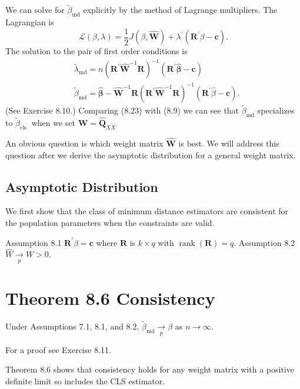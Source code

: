 \documentclass[10pt]{article}
\begin{document}
We can solve for $\widetilde{\beta}_{\mathrm{md}}$ explicitly by the method of Lagrange multipliers. The Lagrangian is
$$
\mathscr{L}(\beta, \lambda)=\frac{1}{2} J(\beta, \widehat{\boldsymbol{W}})+\lambda^{\prime}\left(\boldsymbol{R}^{\prime} \beta-\boldsymbol{c}\right) .
$$
The solution to the pair of first order conditions is
$$
\begin{aligned}
&\widetilde{\lambda}_{\mathrm{md}}=n\left(\boldsymbol{R}^{\prime} \widehat{\boldsymbol{W}}^{-1} \boldsymbol{R}\right)^{-1}\left(\boldsymbol{R}^{\prime} \widehat{\boldsymbol{\beta}}-\boldsymbol{c}\right) \\
&\widetilde{\beta}_{\mathrm{md}}=\widehat{\boldsymbol{\beta}}-\widehat{\boldsymbol{W}}^{-1} \boldsymbol{R}\left(\boldsymbol{R}^{\prime} \widehat{\boldsymbol{W}}^{-1} \boldsymbol{R}\right)^{-1}\left(\boldsymbol{R}^{\prime} \widehat{\beta}-\boldsymbol{c}\right) .
\end{aligned}
$$
(See Exercise 8.10.) Comparing (8.23) with (8.9) we can see that $\widetilde{\beta}_{\mathrm{md}}$ specializes to $\widetilde{\beta}_{\text {cls }}$ when we set $\widehat{\boldsymbol{W}}=\widehat{\boldsymbol{Q}}_{X X}$

An obvious question is which weight matrix $\widehat{\boldsymbol{W}}$ is best. We will address this question after we derive the asymptotic distribution for a general weight matrix.

\subsection{Asymptotic Distribution}
We first show that the class of minimum distance estimators are consistent for the population parameters when the constraints are valid.

Assumption 8.1 $\boldsymbol{R}^{\prime} \beta=\boldsymbol{c}$ where $\boldsymbol{R}$ is $k \times q$ with $\operatorname{rank}(\boldsymbol{R})=q$. Assumption 8.2 $\widehat{W} \underset{p}{\longrightarrow} W>0$.

\section{Theorem 8.6 Consistency}
Under Assumptions 7.1, 8.1, and 8.2, $\widetilde{\beta}_{\mathrm{md}} \underset{p}{\longrightarrow} \beta$ as $n \rightarrow \infty$.

For a proof see Exercise 8.11.

Theorem $8.6$ shows that consistency holds for any weight matrix with a positive definite limit so includes the CLS estimator.
\end{document}
